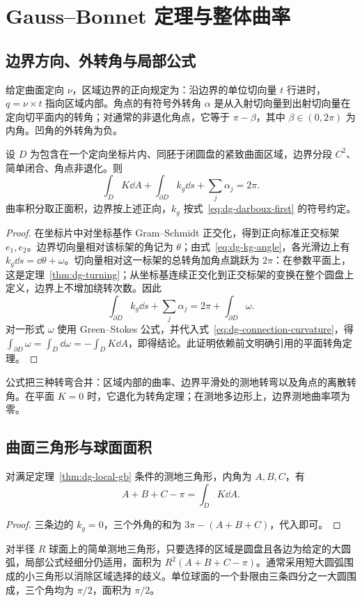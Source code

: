 \setcounter{chapter}{9} %
\chapter{Gauss--Bonnet 定理与整体曲率}
\label{chap:dg-gb}

\section{边界方向、外转角与局部公式}
给定曲面定向 $\nu$，区域边界的正向规定为：沿边界的单位切向量 $t$ 行进时，$q=\nu\times t$ 指向区域内部。角点的有符号外转角 $\alpha$ 是从入射切向量到出射切向量在定向切平面内的转角；对通常的非退化角点，它等于 $\pi-\beta$，其中 $\beta\in(0,2\pi)$ 为内角。凹角的外转角为负。

\begin{theorem}
设 $D$ 为包含在一个定向坐标片内、同胚于闭圆盘的紧致曲面区域，边界分段 $C^2$、简单闭合、角点非退化。则
\begin{equation}
 \int_D K\dd A+\int_{\partial D}k_g\dd s+\sum_j\alpha_j=2\pi.
 \label{eq:dg-local-gb}
\end{equation}
曲率积分取正面积，边界按上述正向，$k_g$ 按式~\eqref{eq:dg-darboux-first} 的符号约定。
\label{thm:dg-local-gb}
\end{theorem}
\begin{proof}
在坐标片中对坐标基作 Gram--Schmidt 正交化，得到正向标准正交标架 $e_1,e_2$。边界切向量相对该标架的角记为 $\theta$；由式~\eqref{eq:dg-kg-angle}，各光滑边上有 $k_g\dd s=\dd\theta+\omega$。切向量相对这一标架的总转角加角点跳跃为 $2\pi$：在参数平面上，这是定理~\ref{thm:dg-turning}；从坐标基连续正交化到正交标架的变换在整个圆盘上定义，边界上不增加绕转次数。因此
\[
 \int_{\partial D}k_g\dd s+\sum_j\alpha_j
 =2\pi+\int_{\partial D}\omega.
\]
对一形式 $\omega$ 使用 Green--Stokes 公式，并代入式~\eqref{eq:dg-connection-curvature}，得 $\int_{\partial D}\omega=\int_D\dd\omega=-\int_DK\dd A$，即得结论。此证明依赖前文明确引用的平面转角定理。
\end{proof}
公式把三种转弯合并：区域内部的曲率、边界平滑处的测地转弯以及角点的离散转角。在平面 $K=0$ 时，它退化为转角定理；在测地多边形上，边界测地曲率项为零。

\section{曲面三角形与球面面积}
\begin{corollary}[测地三角形的角盈]
对满足定理~\ref{thm:dg-local-gb} 条件的测地三角形，内角为 $A,B,C$，有
\begin{equation}
 A+B+C-\pi=\int_DK\dd A.
 \label{eq:dg-angle-excess}
\end{equation}
\end{corollary}
\begin{proof}
三条边的 $k_g=0$，三个外角的和为 $3\pi-(A+B+C)$，代入即可。
\end{proof}
对半径 $R$ 球面上的简单测地三角形，只要选择的区域是圆盘且各边为给定的大圆弧，局部公式经细分仍适用，面积为 $R^2(A+B+C-\pi)$。通常采用短大圆弧围成的小三角形以消除区域选择的歧义。单位球面的一个卦限由三条四分之一大圆围成，三个角均为 $\pi/2$，面积为 $\pi/2$。

